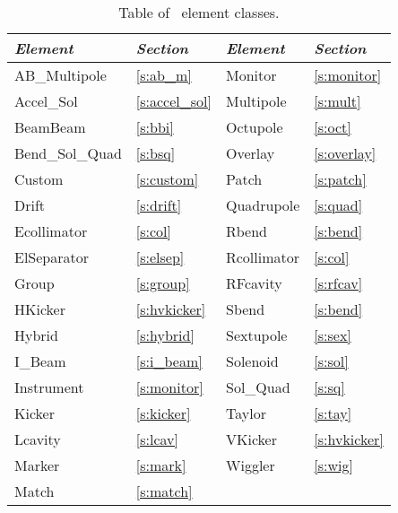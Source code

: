\begin{table}[h]
\centering
{\tt
\begin{tabular}{|l|l||l|l|} \hline
  {\it Element}   & {\it Section}     & {\it Element} & {\it Section}    \\ \hline
  AB\_Multipole   & \ref{s:ab_m}      &  Monitor      & \ref{s:monitor}  \\ \hline
  Accel\_Sol      & \ref{s:accel_sol} &  Multipole    & \ref{s:mult}     \\ \hline
  BeamBeam        & \ref{s:bbi}       &  Octupole     & \ref{s:oct}      \\ \hline
  Bend\_Sol\_Quad & \ref{s:bsq}       &  Overlay      & \ref{s:overlay}  \\ \hline
  Custom          & \ref{s:custom}    &  Patch        & \ref{s:patch}    \\ \hline
  Drift           & \ref{s:drift}     &  Quadrupole   & \ref{s:quad}     \\ \hline
  Ecollimator     & \ref{s:col}       &  Rbend        & \ref{s:bend}     \\ \hline
  ElSeparator     & \ref{s:elsep}     &  Rcollimator  & \ref{s:col}      \\ \hline
  Group           & \ref{s:group}     &  RFcavity     & \ref{s:rfcav}    \\ \hline
  HKicker         & \ref{s:hvkicker}  &  Sbend        & \ref{s:bend}     \\ \hline
  Hybrid          & \ref{s:hybrid}    &  Sextupole    & \ref{s:sex}      \\ \hline
  I\_Beam         & \ref{s:i_beam}    &  Solenoid     & \ref{s:sol}      \\ \hline
  Instrument      & \ref{s:monitor}   &  Sol\_Quad    & \ref{s:sq}       \\ \hline
  Kicker          & \ref{s:kicker}    &  Taylor       & \ref{s:tay}      \\ \hline
  Lcavity         & \ref{s:lcav}      &  VKicker      & \ref{s:hvkicker} \\ \hline
  Marker          & \ref{s:mark}      &  Wiggler      & \ref{s:wig}      \\ \hline
  Match           & \ref{s:match}     &               &                  \\ \hline
  
\end{tabular}
}
\caption{Table of \bmad\ element classes.}
\label{t:elements}\center
\end{table}

